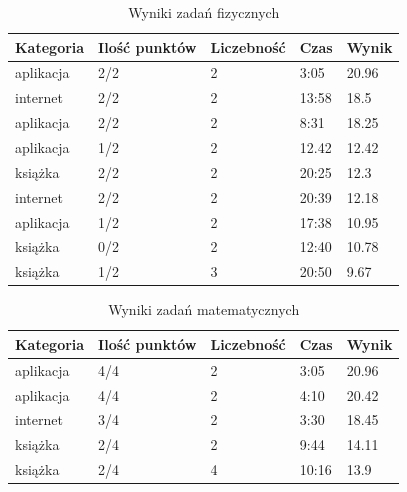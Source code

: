 \documentclass[10pt]{beamer}
\begin{document}
\begin{frame}
  \begin{table}[H]
    \caption{Wyniki zadań fizycznych}
    \centering
    \begin{tabular}{@{}lllll@{}}
      \toprule
      Kategoria & Ilość punktów & Liczebność & Czas & Wynik \\
      \midrule
      aplikacja & 2/2 & 2 & 3:05 & 20.96 \\
      internet & 2/2 & 2 & 13:58 & 18.5 \\
      aplikacja & 2/2 & 2 & 8:31 & 18.25 \\
      aplikacja & 1/2 & 2 & 12.42 & 12.42 \\
      książka & 2/2 & 2 & 20:25 & 12.3 \\
      internet & 2/2 & 2 & 20:39 & 12.18 \\
      aplikacja & 1/2 & 2 & 17:38 & 10.95 \\
      książka & 0/2 & 2 & 12:40 & 10.78 \\
      książka & 1/2 & 3 & 20:50 & 9.67 \\
      \bottomrule
    \end{tabular}
  \end{table}

\end{frame}

\begin{frame}
  \begin{table}[H]
    \caption{Wyniki zadań matematycznych}
    \centering
    \begin{tabular}{@{}lllll@{}}
      \toprule
      Kategoria & Ilość punktów & Liczebność & Czas & Wynik \\
      \midrule
      aplikacja & 4/4 & 2 & 3:05 & 20.96 \\
      aplikacja & 4/4 & 2 & 4:10 & 20.42 \\
      internet & 3/4 & 2 & 3:30 & 18.45\\
      książka & 2/4 & 2 & 9:44 & 14.11 \\
      książka & 2/4 & 4 & 10:16 & 13.9 \\
      \bottomrule
    \end{tabular}
  \end{table}

\end{frame}
\end{document}

